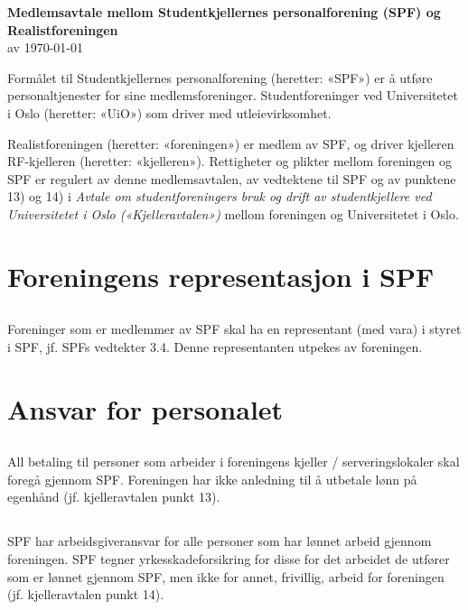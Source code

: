 \documentclass[12pt]{article}
\begin{document}
\pagestyle{fancy}
\fancyhf{}

\begin{center}
    {\LARGE\textbf{Medlemsavtale mellom Studentkjellernes personalforening
    (SPF) og Realistforeningen}}\\[7pt]
    av \today\\[24pt]
\end{center}

Formålet til Studentkjellernes
personalforening (heretter: «SPF») er å utføre 
personaltjenester for sine medlemsforeninger. Studentforeninger ved Universitetet i Oslo
(heretter: «UiO») som driver med utleievirksomhet.

Realistforeningen (heretter: «foreningen»)
er medlem av SPF, og driver kjelleren RF-kjelleren (heretter: «kjelleren»). Rettigheter og plikter mellom 
foreningen og SPF er regulert av denne 
medlemsavtalen, av vedtektene til SPF og av punktene 13) og 
14) i \textit{Avtale om studentforeningers bruk og drift av 
studentkjellere ved Universitetet i Oslo
(«Kjelleravtalen»)} mellom foreningen og 
Universitetet i Oslo.
\section{Foreningens representasjon i SPF}
\label{sec:1}
\subsection{}
\label{sub:1.1}
Foreninger som er medlemmer av SPF skal ha en 
representant (med vara) i styret i SPF, jf. SPFs 
vedtekter 3.4. Denne representanten utpekes av 
foreningen.
\section{Ansvar for personalet}
\label{sec:2}
\subsection{}
\label{sub:2.1}
All betaling til personer som arbeider i foreningens kjeller / serveringslokaler
skal foregå gjennom SPF. Foreningen har ikke anledning til å utbetale lønn på egenhånd 
(jf. kjelleravtalen punkt 13).
\subsection{}
\label{sub:2.2}
SPF har arbeidsgiveransvar for alle personer som 
har lønnet arbeid gjennom foreningen. SPF tegner 
yrkesskadeforsikring for disse for det arbeidet de 
utfører som er lønnet gjennom SPF, men ikke for 
annet, frivillig, arbeid for foreningen (jf. 
kjelleravtalen punkt 14).
\end{document}
